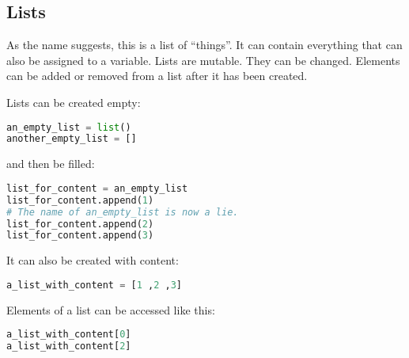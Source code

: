 \documentclass{article}
\begin{document}

\subsection{Lists}\label{lists}

As the name suggests, this is a list of ``things''.
It can contain everything that can also be assigned to a variable.
Lists are mutable. They can be changed.
Elements can be added or removed from a list after it has been created.

Lists can be created empty:

\begin{lstlisting}[language=Python]
an_empty_list = list()
another_empty_list = []
\end{lstlisting}

and then be filled:

\begin{lstlisting}[language=Python]
list_for_content = an_empty_list
list_for_content.append(1)
# The name of an_empty_list is now a lie.
list_for_content.append(2)
list_for_content.append(3)
\end{lstlisting}

It can also be created with content:

\begin{lstlisting}[language=Python]
a_list_with_content = [1 ,2 ,3]
\end{lstlisting}

Elements of a list can be accessed like this:

\begin{lstlisting}[language=Python]
a_list_with_content[0]
a_list_with_content[2]
\end{lstlisting}
\end{document}

